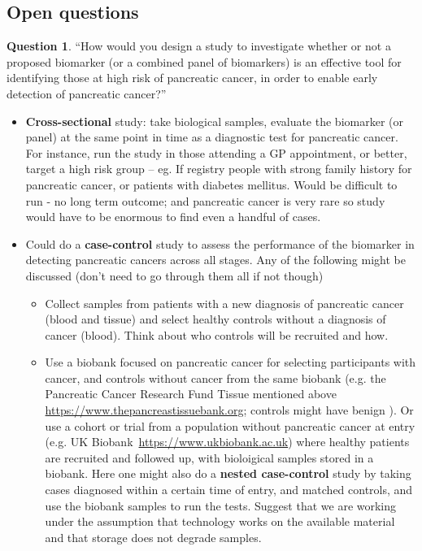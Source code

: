 \documentclass[a4paper,11pt]{scrartcl}
\theoremstyle{plain}
\theoremstyle{remark}
\theoremstyle{definition}
\newtheorem{quest}[thm]{Question}
\begin{document}
\subsection{Open questions}

\begin{quest} ``How would you design a study to investigate whether or not a proposed biomarker (or a combined panel of biomarkers) is an effective tool for identifying those at high risk of pancreatic cancer, in order to enable early detection of pancreatic cancer?'' 
\end{quest}


\begin{itshape}
\begin{itemize}
	\item \textbf{Cross-sectional} study: take biological samples, evaluate the biomarker (or panel) at the same point in time as a diagnostic test for pancreatic cancer. For instance, run the study in those attending a GP appointment, or better, target a high risk group – eg. If registry people with strong family history for pancreatic cancer, or patients with diabetes mellitus. Would be difficult to run - no long term outcome; and pancreatic cancer is very rare so study would have to be enormous to find even a handful of cases.
\item Could do a \textbf{case-control} study to assess the performance of the biomarker in detecting pancreatic cancers across all stages. Any of the following might be discussed (don’t need to go through them all if not though) 
	\begin{itemize}
	\item Collect samples from patients with a new diagnosis of pancreatic cancer (blood and tissue) and select healthy controls without a diagnosis of cancer (blood). Think about who controls will be recruited and how.
	\item Use a biobank focused on pancreatic cancer for selecting participants with cancer, and controls without cancer from the same biobank (e.g. the Pancreatic Cancer Research Fund Tissue mentioned above \url{https://www.thepancreastissuebank.org}; controls might have benign ). Or use a cohort or trial from a population without pancreatic cancer at entry (e.g. UK Biobank~\url{https://www.ukbiobank.ac.uk}) where healthy patients are recruited and followed up, with bioloigical samples stored in a biobank. Here one might also do a \textbf{nested case-control} study by taking cases diagnosed within a certain time of entry, and matched controls, and use the biobank samples to run the tests. Suggest that we are working under the assumption that technology works on the available material and that storage does not degrade samples. 

\end{itemize}
\end{itemize}
\end{itshape}
\end{document}
